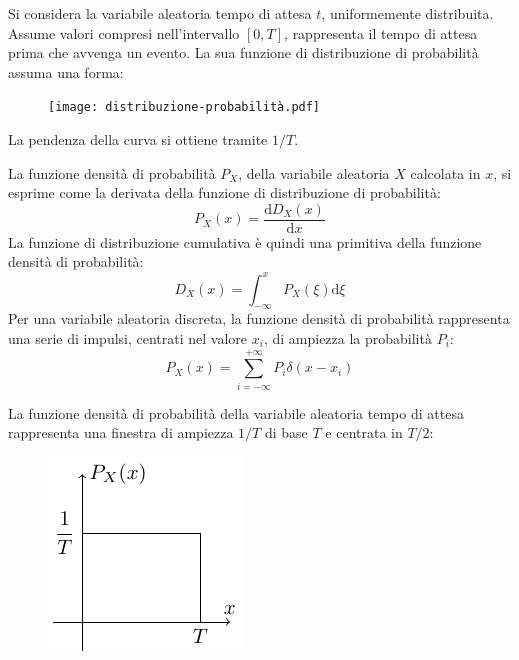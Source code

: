 \documentclass{article}
\newcommand{\df}{\mathrm{d}}
\numberwithin{equation}{subsection}
\begin{document}
Si considera la variabile aleatoria tempo di attesa $t$, uniformemente distribuita. Assume valori compresi nell'intervallo $[0,T]$, rappresenta il tempo di attesa prima 
che avvenga un evento. La sua funzione di distribuzione di probabilità assuma una forma:
\begin{figure}[H]%
    \centering
    \texttt{[image: distribuzione-probabilità.pdf]}%
\end{figure}

La pendenza della curva si ottiene tramite $1/T$. 



La funzione densità di probabilità $P_X$, della variabile aleatoria $X$ calcolata in $x$, si esprime come la derivata della funzione di distribuzione di probabilità:
\begin{equation}
    P_X(x)=\displaystyle\frac{\df D_X(x)}{\df x}
\end{equation}
La funzione di distribuzione cumulativa è quindi una primitiva della funzione densità di probabilità:
\begin{equation}
    D_X(x)=\displaystyle\int_{-\infty}^{x}P_X(\xi)\df\xi
\end{equation}
Per una variabile aleatoria discreta, la funzione densità di probabilità rappresenta una serie di impulsi, centrati nel valore $x_i$, di ampiezza la probabilità $P_i$:
\begin{equation}
    P_X(x)=\displaystyle\sum_{i=-\infty}^{+\infty}P_i\delta(x-x_i)
\end{equation}

La funzione densità di probabilità della variabile aleatoria tempo di attesa rappresenta una finestra di ampiezza $1/T$ di base $T$ e centrata in $T/2$:
\begin{figure}[H]%
    \centering
    \includegraphics{densità-probabilità.pdf}%
\end{figure}
\end{document}
